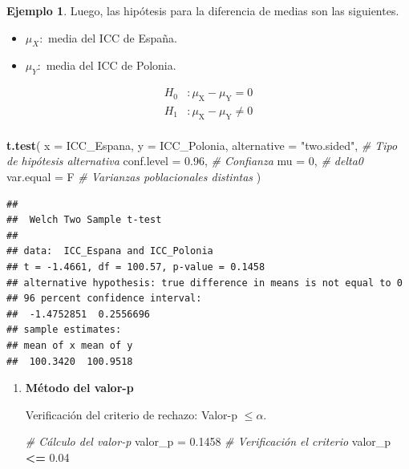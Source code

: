 \documentclass[
  11pt,
]{book}
\newenvironment{Shaded}{\begin{snugshade}}{\end{snugshade}}
\newcommand{\AttributeTok}[1]{\textcolor[rgb]{0.13,0.29,0.53}{#1}}
\newcommand{\CommentTok}[1]{\textcolor[rgb]{0.56,0.35,0.01}{\textit{#1}}}
\newcommand{\DecValTok}[1]{\textcolor[rgb]{0.00,0.00,0.81}{#1}}
\newcommand{\FloatTok}[1]{\textcolor[rgb]{0.00,0.00,0.81}{#1}}
\newcommand{\FunctionTok}[1]{\textcolor[rgb]{0.13,0.29,0.53}{\textbf{#1}}}
\newcommand{\NormalTok}[1]{#1}
\newcommand{\OtherTok}[1]{\textcolor[rgb]{0.56,0.35,0.01}{#1}}
\newcommand{\SpecialCharTok}[1]{\textcolor[rgb]{0.81,0.36,0.00}{\textbf{#1}}}
\newcommand{\StringTok}[1]{\textcolor[rgb]{0.31,0.60,0.02}{#1}}
\providecommand{\tightlist}{%
  \setlength{\itemsep}{0pt}\setlength{\parskip}{0pt}}
\theoremstyle{definition}
\theoremstyle{definition}
\newtheorem{example}{Ejemplo}[chapter]
\theoremstyle{definition}
\theoremstyle{definition}
\theoremstyle{remark}
\begin{document}
\begin{example}
Luego, las hipótesis para la diferencia de medias son las siguientes.

\begin{itemize}
\tightlist
\item
  \(\mu_X:\) media del ICC de España.
\item
  \(\mu_Y:\) media del ICC de Polonia.
\end{itemize}

\begin{equation}
  \begin{split}
    H_0&: \mu_{\text{X}} - \mu_{\text{Y}} = 0\\
    H_1&: \mu_{\text{X}} - \mu_{\text{Y}} \neq 0\\
  \end{split}
\end{equation}

\begin{Shaded}
\begin{Highlighting}[]
\FunctionTok{t.test}\NormalTok{(}
  \AttributeTok{x =}\NormalTok{ ICC\_Espana,}
  \AttributeTok{y =}\NormalTok{ ICC\_Polonia,}
  \AttributeTok{alternative =} \StringTok{"two.sided"}\NormalTok{, }\CommentTok{\# Tipo de hipótesis alternativa}
  \AttributeTok{conf.level =} \FloatTok{0.96}\NormalTok{, }\CommentTok{\# Confianza}
  \AttributeTok{mu =} \DecValTok{0}\NormalTok{, }\CommentTok{\# delta0}
  \AttributeTok{var.equal =}\NormalTok{ F }\CommentTok{\# Varianzas poblacionales distintas}
\NormalTok{)}
\end{Highlighting}
\end{Shaded}

\begin{verbatim}
## 
##  Welch Two Sample t-test
## 
## data:  ICC_Espana and ICC_Polonia
## t = -1.4661, df = 100.57, p-value = 0.1458
## alternative hypothesis: true difference in means is not equal to 0
## 96 percent confidence interval:
##  -1.4752851  0.2556696
## sample estimates:
## mean of x mean of y 
##  100.3420  100.9518
\end{verbatim}

\begin{enumerate}
\def\labelenumi{\arabic{enumi}.}
\item
  \textbf{Método del valor-p}

  Verificación del criterio de rechazo: Valor-p \(\leq \alpha\).

\begin{Shaded}
\begin{Highlighting}[]
\CommentTok{\# Cálculo del valor{-}p}
\NormalTok{valor\_p }\OtherTok{=} \FloatTok{0.1458}
\CommentTok{\# Verificación el criterio}
\NormalTok{valor\_p }\SpecialCharTok{\textless{}=} \FloatTok{0.04}
\end{Highlighting}
\end{Shaded}


\end{enumerate}
\end{example}
\end{document}
